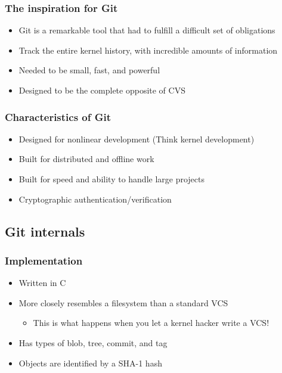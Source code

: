 \documentclass{beamer}
\begin{document}
\begin{frame}
  \frametitle{The inspiration for Git}
  \begin{itemize}
    \item Git is a remarkable tool that had to fulfill a difficult set of obligations
    \item Track the entire kernel history, with incredible amounts of information
    \item Needed to be small, fast, and powerful
    \item Designed to be the complete opposite of CVS
  \end{itemize}
\end{frame}

\begin{frame}
  \frametitle{Characteristics of Git}
  \begin{itemize}
    \item Designed for nonlinear development (Think kernel development)
    \item Built for distributed and offline work
    \item Built for speed and ability to handle large projects
    \item Cryptographic authentication/verification
  \end{itemize}
\end{frame}

\subsection{Git internals}

\begin{frame}
  \frametitle{Implementation}
  \begin{itemize}
    \item Written in C
    \item More closely resembles a filesystem than a standard VCS
      \begin{itemize}
	\item This is what happens when you let a kernel hacker write a VCS!
      \end{itemize}
    \item Has types of blob, tree, commit, and tag
    \item Objects are identified by a SHA-1 hash
  \end{itemize}
\end{frame}
\end{document}
